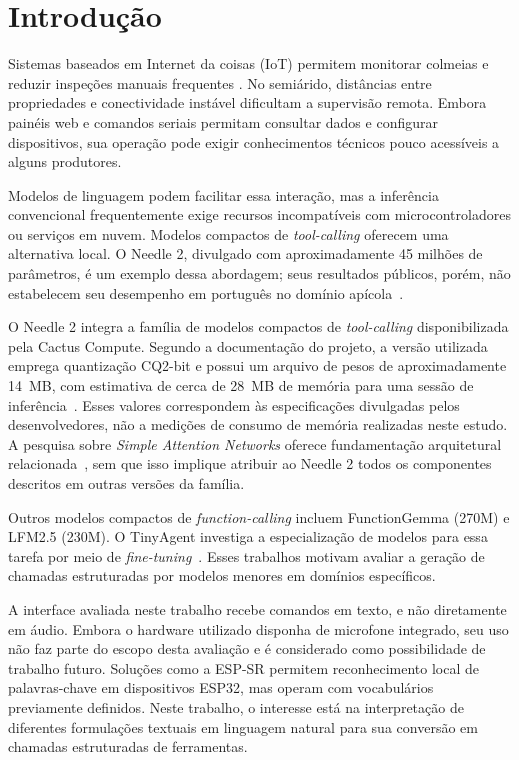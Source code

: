 \documentclass[12pt]{article}
\begin{document}
\section{Introdução}

Sistemas baseados em Internet da coisas (IoT) permitem monitorar colmeias e reduzir inspeções manuais frequentes \cite{henry2019precision,meikle2015application}. No semiárido, distâncias entre propriedades e conectividade instável dificultam a supervisão remota. Embora painéis web e comandos seriais permitam consultar dados e configurar dispositivos, sua operação pode exigir conhecimentos técnicos pouco acessíveis a alguns produtores.

Modelos de linguagem podem facilitar essa interação, mas a inferência convencional frequentemente exige recursos incompatíveis com microcontroladores ou serviços em nuvem. Modelos compactos de \textit{tool-calling} oferecem uma alternativa local. O Needle 2, divulgado com aproximadamente 45 milhões de parâmetros, é um exemplo dessa abordagem; seus resultados públicos, porém, não estabelecem seu desempenho em português no domínio apícola~\cite{cactusneedle2repo}.

O Needle 2 integra a família de modelos compactos de
\textit{tool-calling} disponibilizada pela Cactus Compute. Segundo
a documentação do projeto, a versão utilizada emprega quantização
CQ2-bit e possui um arquivo de pesos de aproximadamente 14~MB,
com estimativa de cerca de 28~MB de memória para uma sessão de
inferência~\cite{cactusneedle2repo}. Esses valores correspondem
às especificações divulgadas pelos desenvolvedores, não a medições
de consumo de memória realizadas neste estudo. A pesquisa sobre
\textit{Simple Attention Networks} oferece fundamentação arquitetural
relacionada~\cite{ndubuaku2026controlled}, sem que isso implique
atribuir ao Needle 2 todos os componentes descritos em outras
versões da família.

Outros modelos compactos de \textit{function-calling} incluem FunctionGemma (270M) e LFM2.5 (230M). O TinyAgent investiga a especialização de modelos para essa tarefa por meio de \textit{fine-tuning}~\cite{erdogan2024tinyagent}. Esses trabalhos motivam avaliar a geração de chamadas estruturadas por modelos menores em domínios específicos.

A interface avaliada neste trabalho recebe comandos em texto, e não
diretamente em áudio. Embora o hardware utilizado disponha de microfone
integrado, seu uso não faz parte do escopo desta avaliação e é considerado
como possibilidade de trabalho futuro. Soluções como a ESP-SR
\cite{espressif2026espsr} permitem reconhecimento local de palavras-chave
em dispositivos ESP32, mas operam com vocabulários previamente definidos.
Neste trabalho, o interesse está na interpretação de diferentes
formulações textuais em linguagem natural para sua conversão em chamadas
estruturadas de ferramentas.
\end{document}
